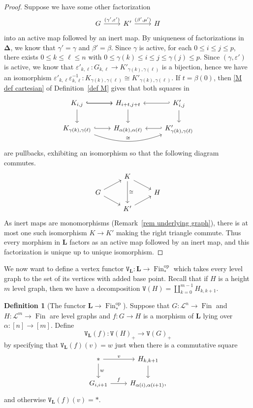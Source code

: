\documentclass{amsart}
\numberwithin{theorem}{subsection}
\theoremstyle{definition}
\newtheorem{definition}[theorem]{Definition}
\providecommand{\op}{\mathrm{op}}
\newcommand{\finset}{\operatorname{Fin}}
\newcommand{\pfinset}{\finset_*}
\newcommand{\simp}{\mathbf{\Delta}}
\newcommand{\levelg}{\mathbf{L}}
\newcommand{\vertex}{\mathtt{V}}
\newcommand{\scriptyell}{\mathscr L}
\begin{document}
\begin{proof}
Suppose we have some other factorization
\[ \begin{tikzcd}
G \rar{(\gamma', \varepsilon')} & K' \rar{(\beta', \mu')} & H
\end{tikzcd} \]
into an active map followed by an inert map.
By uniqueness of factorizations in $\simp$, we know that $\gamma' = \gamma$ and $\beta' = \beta$.
Since $\gamma$ is active, for each $0 \leq i \leq j \leq p$, there exists $0\leq k \leq \ell \leq n$ with $0\leq \gamma(k) \leq i \leq j \leq \gamma(j) \leq p$.
Since $(\gamma, \varepsilon')$ is active, we know that $\varepsilon'_{k,\ell} \colon G_{k,\ell} \to K'_{\gamma(k),\gamma(\ell)}$ is a bijection, hence we have an isomorphism $\varepsilon'_{k,\ell} \varepsilon^{-1}_{k,\ell}  \colon K_{\gamma(k),\gamma(\ell)} \cong K'_{\gamma(k),\gamma(\ell)}$.
If $t=\beta(0)$, then \eqref{M def cartesian} of Definition~\ref{def M} gives that both squares in
\[ \begin{tikzcd}
K_{i,j} \arrow[r, hook] \arrow[r, hook] \dar& H_{i+t,j+t} \dar &  K'_{i,j} \arrow[l, hook'] \dar \\
K_{\gamma(k),\gamma(\ell)} \arrow[r, hook] \arrow[rr, bend right=20, "\cong"] & H_{\alpha(k), \alpha(\ell)} & K'_{\gamma(k),\gamma(\ell)} \arrow[l, hook']
\end{tikzcd} \]
are pullbacks, exhibiting an isomorphism so that the following diagram commutes.
\[ \begin{tikzcd}[row sep=small]
& K \arrow[dr]  
\ar[dd, "\cong"]
\\
G \arrow[ur] 
\arrow[dr]
& & H \\
& K' \ar[ur]
\end{tikzcd} \]
As inert maps are monomorphisms (Remark~\ref{rem underlying graph}), there is at most one such isomorphism $K\to K'$ making the right triangle commute.
Thus every morphism in $\levelg$ factors as an active map followed by an inert map, and this factorization is unique up to unique isomorphism.
\end{proof}

We now want to define a vertex functor $\vertex_{\levelg}\colon \levelg \to \pfinset^\op$ which takes every level graph to the set of its vertices with added base point.
Recall that if $H$ is a height $m$ level graph, then we have a decomposition $\vertex(H) = \coprod_{k=0}^{m-1} H_{k,k+1}$.

\begin{definition}[The functor $\levelg\to\pfinset^\op$] \label{def vertex levelg}
Suppose that $G\colon \scriptyell^n \to \finset$ and $H\colon \scriptyell^m \to \finset$ are level graphs and $f\colon G \to H$ is a morphism of $\levelg$ lying over $\alpha \colon [n] \to [m]$.
Define 
\[
	\vertex_{\levelg} (f) \colon \vertex(H)_+ \rightarrow \vertex(G)_+
\]
by specifying that $\vertex_{\levelg} (f) (v) = w$ just when there is a commutative square
\[ \begin{tikzcd}
\ast \rar{v} \dar{w} & H_{k,k+1} \dar \\
G_{i,i+1} \rar{f} & H_{\alpha(i), \alpha(i+1)},
\end{tikzcd} \]
and otherwise $\vertex_{\levelg} (f) (v) = \ast$.
\end{definition}
\end{document}
